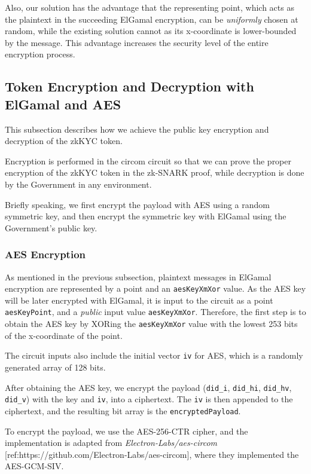 \documentclass[
]{report}
\begin{document}
Also, our solution has the advantage that the representing point, which
acts as the plaintext in the succeeding ElGamal encryption, can be
\emph{uniformly} chosen at random, while the existing solution cannot as
its x-coordinate is lower-bounded by the message. This advantage
increases the security level of the entire encryption process.

\subsection{Token Encryption and Decryption with ElGamal and AES}

This subsection describes how we achieve the public key encryption and
decryption of the zkKYC token.

Encryption is performed in the circom circuit so that we can prove the
proper encryption of the zkKYC token in the zk-SNARK proof, while
decryption is done by the Government in any environment.

Briefly speaking, we first encrypt the payload with AES using a random
symmetric key, and then encrypt the symmetric key with ElGamal using the
Government's public key.

\subsubsection{AES Encryption}

As mentioned in the previous subsection, plaintext messages in ElGamal
encryption are represented by a point and an \texttt{aesKeyXmXor} value.
As the AES key will be later encrypted with ElGamal, it is input to the
circuit as a point \texttt{aesKeyPoint}, and a \emph{public} input value
\texttt{aesKeyXmXor}. Therefore, the first step is to obtain the AES key
by XORing the \texttt{aesKeyXmXor} value with the lowest 253 bits of the
x-coordinate of the point.

The circuit inputs also include the initial vector \texttt{iv} for AES,
which is a randomly generated array of 128 bits.

After obtaining the AES key, we encrypt the payload (\texttt{did\_i},
\texttt{did\_hi}, \texttt{did\_hv}, \texttt{did\_v}) with the key and
\texttt{iv}, into a ciphertext. The \texttt{iv} is then appended to the
ciphertext, and the resulting bit array is the
\texttt{encryptedPayload}.

To encrypt the payload, we use the AES-256-CTR cipher, and the
implementation is adapted from \emph{Electron-Labs/aes-circom}
{[}ref:https://github.com/Electron-Labs/aes-circom{]},
where they implemented the AES-GCM-SIV.
\end{document}
